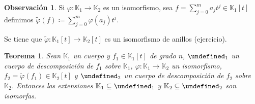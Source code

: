 \documentclass[10pt, spanish]{report}
\newtheorem{tma}{Teorema}[chapter]
\theoremstyle{definition}
\newtheorem*{obs}{Observación}
\newcommand{\K}{\mathbb{K}}
\let\L\undefined
\newcommand{\L}{\mathbb{L}}
\begin{document}
\begin{obs}
    Si $\varphi:\K_1 \to \K_2$ es un isomorfismo, sea $f=\sum_{j=0}^ma_jt^j\in
    \K_1[t]$ definimos $\tilde{\varphi}(f)\coloneqq\sum_{j=0}^m\varphi(a_j)t^j$.

    Se tiene que $\tilde{\varphi}:\K_1[t]\to \K_2[t]$ es un isomorfismo de
    anillos (ejercicio).
\end{obs}

\begin{tma}
    Sean $\K_1$ un cuerpo y $f_1\in\K_1[t]$ de grado $n$, $\L_1$ un cuerpo de
    descomposición de $f_1$ sobre $\K_1$, $\varphi:\K_1\to\K_2$ un isomorfismo,
    $f_2=\tilde{\varphi}(f_1)\in\K_2[t]$ y $\L_2$ un cuerpo de descomposición de
    $f_2$ sobre $\K_2$. Entonces las extensiones $\K_1\subseteq\L_1$ y
    $\K_2\subseteq\L_2$ son isomorfas.
\end{tma}
\end{document}
